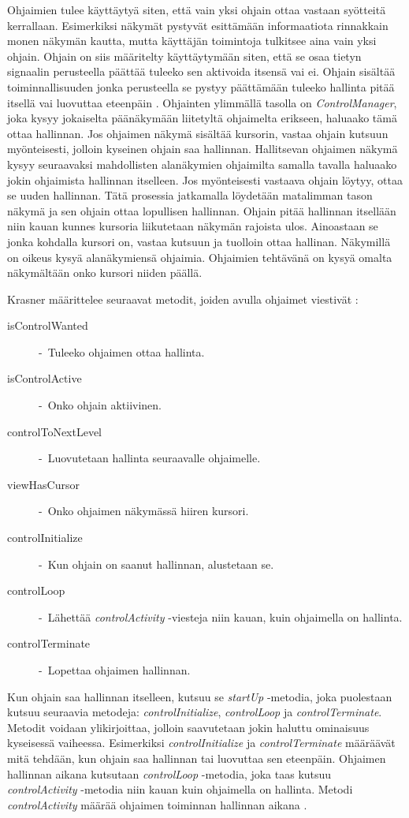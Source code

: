 \documentclass[utf8]{gradu3}
\begin{document}
Ohjaimien tulee käyttäytyä siten, että vain yksi ohjain ottaa vastaan syötteitä kerrallaan. Esimerkiksi näkymät pystyvät esittämään informaatiota rinnakkain monen näkymän kautta, mutta käyttäjän toimintoja tulkitsee aina vain yksi ohjain. Ohjain on siis määritelty käyttäytymään siten, että se osaa tietyn signaalin perusteella päättää tuleeko sen aktivoida itsensä vai ei. Ohjain sisältää toiminnallisuuden jonka perusteella se pystyy päättämään tuleeko hallinta pitää itsellä vai luovuttaa eteenpäin \parencite[s. 9]{krasner_desc}. Ohjainten ylimmällä tasolla on \textit{ControlManager}, joka kysyy jokaiselta päänäkymään liitetyltä ohjaimelta erikseen, haluaako tämä ottaa hallinnan. Jos ohjaimen näkymä sisältää kursorin, vastaa ohjain kutsuun myönteisesti, jolloin kyseinen ohjain saa hallinnan. Hallitsevan ohjaimen näkymä kysyy seuraavaksi mahdollisten alanäkymien ohjaimilta samalla tavalla haluaako jokin ohjaimista hallinnan itselleen. Jos myönteisesti vastaava ohjain löytyy, ottaa se uuden hallinnan. Tätä prosessia jatkamalla löydetään matalimman tason näkymä ja sen ohjain ottaa lopullisen hallinnan. Ohjain pitää hallinnan itsellään niin kauan kunnes kursoria liikutetaan näkymän rajoista ulos. Ainoastaan se jonka kohdalla kursori on, vastaa kutsuun ja tuolloin ottaa hallinan. Näkymillä on oikeus kysyä alanäkymiensä ohjaimia. Ohjaimien tehtävänä on kysyä omalta näkymältään onko kursori niiden päällä.

Krasner määrittelee seuraavat metodit, joiden avulla ohjaimet viestivät \parencite[s. 9]{krasner_desc}:

\begin{description}
\item[isControlWanted] -\ Tuleeko ohjaimen ottaa hallinta.
\item[isControlActive] -\ Onko ohjain aktiivinen.
\item[controlToNextLevel] -\ Luovutetaan hallinta seuraavalle ohjaimelle.
\item[viewHasCursor] -\ Onko ohjaimen näkymässä hiiren kursori.
\item[controlInitialize] -\ Kun ohjain on saanut hallinnan, alustetaan se.
\item[controlLoop] -\ Lähettää \emph{controlActivity} -viesteja niin kauan, kuin ohjaimella on hallinta.
\item[controlTerminate] -\ Lopettaa ohjaimen hallinnan.
\end{description} 

Kun ohjain saa hallinnan itselleen, kutsuu se \emph{startUp} -metodia, joka puolestaan kutsuu seuraavia metodeja: \emph{controlInitialize}, \emph{controlLoop} ja \emph{controlTerminate}. Metodit
voidaan ylikirjoittaa, jolloin saavutetaan jokin haluttu ominaisuus kyseisessä vaiheessa. Esimerkiksi \emph{controlInitialize} ja \emph{controlTerminate} määräävät mitä tehdään, kun ohjain saa hallinnan tai luovuttaa sen eteenpäin. Ohjaimen hallinnan aikana kutsutaan
\emph{controlLoop} -metodia, joka taas kutsuu \emph{controlActivity} -metodia niin kauan kuin ohjaimella on hallinta.  Metodi \emph{controlActivity} määrää ohjaimen toiminnan hallinnan aikana \cite[s. 9]{krasner_desc}.
\end{document}
